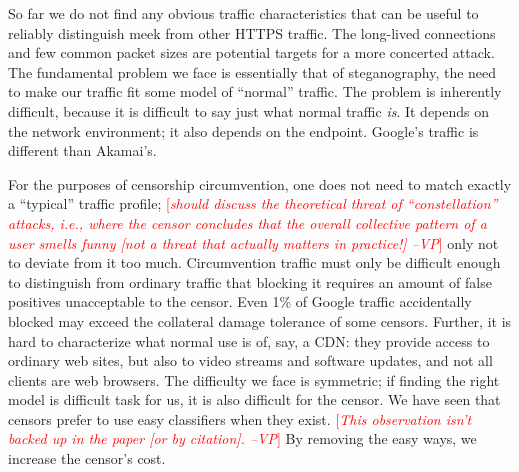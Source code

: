 \documentclass{sig-alternate}
\newcommand{\meek}{meek\xspace}
\newcommand{\note}[1]{{\textcolor{red}{[\textit{#1}]}}}
\newcommand{\vp}[1]{\note{#1 --VP}}
\begin{document}

So far we do not find any obvious traffic characteristics that can be useful to reliably distinguish \meek
from other HTTPS traffic.
The long-lived connections and few common packet sizes are
potential targets for a more concerted attack.
The fundamental problem we face is essentially that of steganography,
the need to make our traffic fit some model of ``normal'' traffic.
The problem is inherently difficult,
because it is difficult to say just what normal traffic \emph{is}.
It depends on the network environment;
it also depends on the endpoint.
Google's traffic is different than Akamai's.

For the purposes of censorship circumvention,
one does not need to match exactly a ``typical'' traffic profile;
\vp{should discuss the theoretical threat of ``constellation'' attacks,
i.e., where the censor concludes that the overall collective pattern
of a user smells funny [not a threat that actually matters in practice!]}
only not to deviate from it too much.
Circumvention traffic must only be difficult enough to distinguish from ordinary traffic
that blocking it requires an amount of false positives unacceptable to the censor.
Even 1\% of Google traffic accidentally blocked may exceed the collateral damage tolerance of some censors.
Further, it is hard to characterize what normal use is of, say, a CDN:
they provide access to ordinary web sites,
but also to video streams and software updates,
and not all clients are web browsers.
The difficulty we face is symmetric;
if finding the right model is difficult task for us,
it is also difficult for the censor.
We have seen that censors prefer to use easy classifiers when they exist.
\vp{This observation isn't backed up in the paper [or by citation].}
By removing the easy ways, we increase the censor's cost.

\end{document}
